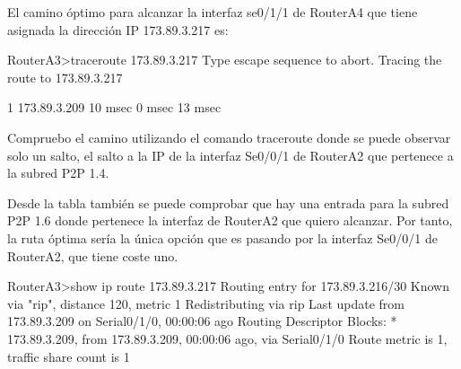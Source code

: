 \par El camino óptimo para alcanzar la interfaz se0/1/1 de RouterA4 que tiene asignada la dirección IP 173.89.3.217 es:
\begin{listing}[style=consola]
RouterA3>traceroute 173.89.3.217 
Type escape sequence to abort.
Tracing the route to 173.89.3.217

  1   173.89.3.209    10 msec   0 msec    13 msec

\end{listing}
\par Compruebo el camino utilizando el comando traceroute donde se puede observar solo un salto, el salto a la IP de la interfaz Se0/0/1 de RouterA2 que pertenece a la subred P2P 1.4.
\par Desde la tabla también se puede comprobar que hay una entrada para la subred P2P 1.6 donde pertenece la interfaz de RouterA2 que quiero alcanzar. Por tanto, la ruta óptima sería la única opción que es pasando por la interfaz Se0/0/1 de RouterA2, que tiene coste uno.
\begin{listing}[style=consola]
RouterA3>show ip route 173.89.3.217
Routing entry for 173.89.3.216/30
Known via "rip", distance 120, metric 1
  Redistributing via rip
  Last update from 173.89.3.209 on Serial0/1/0, 00:00:06 ago
  Routing Descriptor Blocks:
  * 173.89.3.209, from 173.89.3.209, 00:00:06 ago, via Serial0/1/0
      Route metric is 1, traffic share count is 1
\end{listing}





